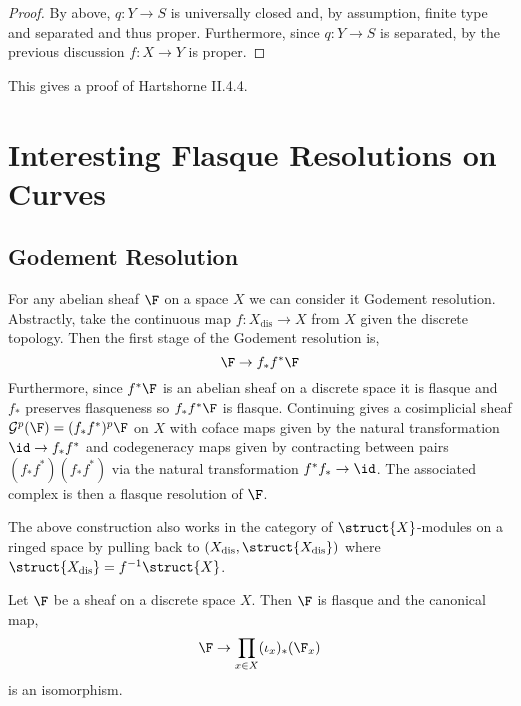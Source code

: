 \documentclass[12pt]{article}
\begin{document}
\begin{proof}
By above, $q : Y \to S$ is universally closed and, by assumption, finite type and separated and thus proper. Furthermore, since $q : Y \to S$ is separated, by the previous discussion $f : X \to Y$ is proper.
\end{proof}

\begin{rmk}
This gives a proof of Hartshorne II.4.4.
\end{rmk}

\section{Interesting Flasque Resolutions on Curves}

\subsection{Godement Resolution}

For any abelian sheaf $\F$ on a space $X$ we can consider it Godement resolution. Abstractly, take the continuous map $f : X_{\text{dis}} \to X$ from $X$ given the discrete topology. Then the first stage of the Godement resolution is,
\[ \F \to f_* f^* \F \]
Furthermore, since $f^* \F$ is an abelian sheaf on a discrete space it is flasque and $f_*$ preserves flasqueness so $f_* f^* \F$ is flasque.
Continuing gives a cosimplicial sheaf $\mathcal{G}^p(\F) = (f_* f^*)^p \F$ on $X$ with coface maps given by the natural transformation $\id \to f_* f^*$ and codegeneracy maps given by contracting between pairs $(f_* f^*)(f_* f^*)$ via the natural transformation $f^* f_* \to \id$.
The associated complex is then a flasque resolution of $\F$.

\begin{rmk}
The above construction also works in the category of $\struct{X}$-modules on a ringed space by pulling back to $(X_{\text{dis}}, \struct{X_{\text{dis}}})$ where $\struct{X_{\text{dis}}} = f^{-1} \struct{X}$.
\end{rmk}

\begin{lemma}
Let $\F$ be a sheaf on a discrete space $X$. Then $\F$ is flasque and the canonical map,
\[ \F \to \prod_{x \in X} (\iota_x)_* (\F_x) \]
is an isomorphism.
\end{lemma}
\end{document}
